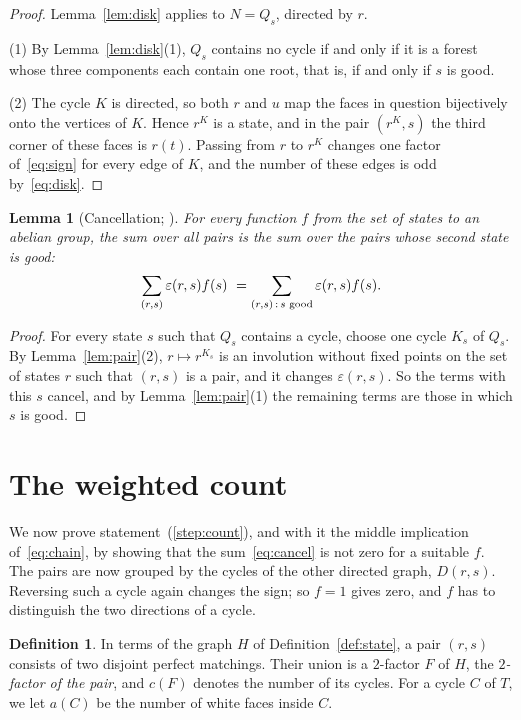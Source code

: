 \documentclass[a4paper]{amsart}
\numberwithin{equation}{section}
\newtheorem{lemma}[equation]{Lemma}
\theoremstyle{definition}
\newtheorem{definition}[equation]{Definition}
\newcommand{\eps}{\varepsilon}
\begin{document}
\begin{proof}
Lemma~\ref{lem:disk} applies to $N=Q_s$, directed by $r$.

(1) By Lemma~\ref{lem:disk}(1), $Q_s$ contains no cycle if and only if it is a forest whose three components each contain one root, that is, if and only if $s$ is good.

(2) The cycle $K$ is directed, so both $r$ and $u$ map the faces in question bijectively onto the vertices of $K$.
Hence $r^K$ is a state, and in the pair $(r^K,s)$ the third corner of these faces is $r(t)$.
Passing from $r$ to $r^K$ changes one factor of~\eqref{eq:sign} for every edge of $K$, and the number of these edges is odd by~\eqref{eq:disk}.
\end{proof}

\begin{lemma}[Cancellation; {\cite[Lemma~5.2]{OpenAI}}]\label{lem:cancel}
For every function $f$ from the set of states to an abelian group, the sum over all pairs is the sum over the pairs whose second state is good:
\begin{equation}\label{eq:cancel}
\sum_{(r,s)}\eps(r,s)f(s)\ =\sum_{(r,s)\,:\,s\textup{ good}}\eps(r,s)f(s).
\end{equation}
\end{lemma}

\begin{proof}
For every state $s$ such that $Q_s$ contains a cycle, choose one cycle $K_s$ of $Q_s$.
By Lemma~\ref{lem:pair}(2), $r\mapsto r^{K_s}$ is an involution without fixed points on the set of states $r$ such that $(r,s)$ is a pair, and it changes $\eps(r,s)$.
So the terms with this $s$ cancel, and by Lemma~\ref{lem:pair}(1) the remaining terms are those in which $s$ is good.
\end{proof}

\section{The weighted count}\label{sec:count}

We now prove statement~(\ref{step:count}), and with it the middle implication of~\eqref{eq:chain}, by showing that the sum~\eqref{eq:cancel} is not zero for a suitable $f$.
The pairs are now grouped by the cycles of the other directed graph, $D(r,s)$.
Reversing such a cycle again changes the sign; so $f=1$ gives zero, and $f$ has to distinguish the two directions of a cycle.

\begin{definition}\label{def:factor}
In terms of the graph $H$ of Definition~\ref{def:state}, a pair $(r,s)$ consists of two disjoint perfect matchings.
Their union is a $2$-factor $F$ of $H$, the \emph{$2$-factor of the pair}, and $c(F)$ denotes the number of its cycles.
For a cycle $C$ of $T$, we let $a(C)$ be the number of white faces inside $C$.
\end{definition}
\end{document}
